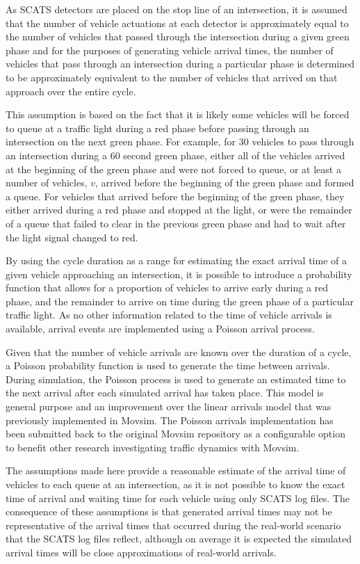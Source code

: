 As SCATS detectors are placed on the stop line of an intersection, it is assumed that the number of vehicle actuations at each detector is approximately equal to the number of vehicles that passed through the intersection during a given green phase and for the purposes of generating vehicle arrival times, the number of vehicles that pass through an intersection during a particular phase is determined to be approximately equivalent to the number of vehicles that arrived on that approach over the entire cycle. 

This assumption is based on the fact that it is likely some vehicles will be forced to queue at a traffic light during a red phase before passing through an intersection on the next green phase. For example, for 30 vehicles to pass through an intersection during a 60 second green phase, either all of the vehicles arrived at the beginning of the green phase and were not forced to queue, or at least a number of vehicles, $v$, arrived before the beginning of the green phase and formed a queue. For vehicles that arrived before the beginning of the green phase, they either arrived during a red phase and stopped at the light, or were the remainder of a queue that failed to clear in the previous green phase and had to wait after the light signal changed to red. 

By using the cycle duration as a range for estimating the exact arrival time of a given vehicle approaching an intersection, it is possible to introduce a probability function that allows for a proportion of vehicles to arrive early during a red phase, and the remainder to arrive on time during the green phase of a particular traffic light. As no other information related to the time of vehicle arrivals is available, arrival events are implemented using a Poisson arrival process. 

Given that the number of vehicle arrivals are known over the duration of a cycle, a Poisson probability function is used to generate the time between arrivals. During simulation, the Poisson process is used to generate an estimated time to the next arrival after each simulated arrival has taken place. This model is general purpose and an improvement over the linear arrivals model that was previously implemented in Movsim. The Poisson arrivals implementation has been submitted back to the original Movsim repository as a configurable option to benefit other research investigating traffic dynamics with Movsim. 

The assumptions made here provide a reasonable estimate of the arrival time of vehicles to each queue at an intersection, as it is not possible to know the exact time of arrival and waiting time for each vehicle using only SCATS log files. The consequence of these assumptions is that generated arrival times may not be representative of the arrival times that occurred during the real-world scenario that the SCATS log files reflect, although on average it is expected the simulated arrival times will be close approximations of real-world arrivals. 

